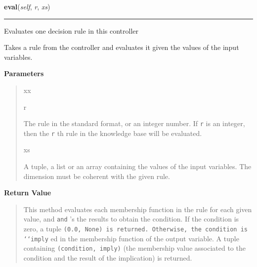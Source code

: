     \label{peach:fuzzy:control:Controller:eval}

    \vspace{0.5ex}

    \begin{boxedminipage}{\textwidth}

    \raggedright \textbf{eval}(\textit{self}, \textit{r}, \textit{xs})

    \vspace{-1.5ex}

    \rule{\textwidth}{0.5\fboxrule}

Evaluates one decision rule in this controller

Takes a rule from the controller and evaluates it given the values of
the input variables.
    \vspace{1ex}

      \textbf{Parameters}
      \begin{quote}
        \begin{Ventry}{xx}

          \item[r]


The rule in the standard format, or an integer number. If \texttt{r} is
an integer, then the \texttt{r} th rule in the knowledge base will be
evaluated.
          \item[xs]


A tuple, a list or an array containing the values of the input
variables. The dimension must be coherent with the given rule.
        \end{Ventry}

      \end{quote}

    \vspace{1ex}

      \textbf{Return Value}
      \begin{quote}

This method evaluates each membership function in the rule for each
given value, and \texttt{and} 's the results to obtain the condition. If
the condition is zero, a tuple \texttt{(0.0, None) is returned. Otherwise,
the condition is `{}`imply} ed in the membership function of the output
variable. A tuple containing \texttt{(condition, imply)} (the membership
value associated to the condition and the result of the implication)
is returned.
      \end{quote}

    \vspace{1ex}

    \end{boxedminipage}

